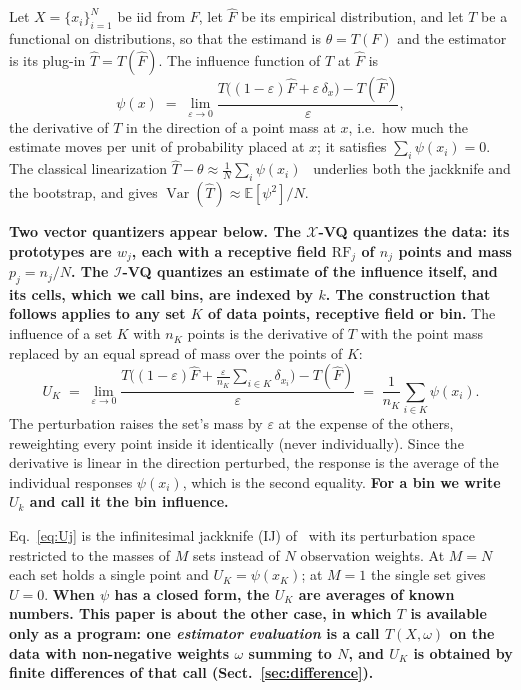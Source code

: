 \documentclass[runningheads]{llncs}
\newif\ifrev \revtrue
\newcommand{\rev}[1]{\ifrev{\color{blue}\bfseries #1}\else#1\fi}
\newcommand{\XVQ}{\ensuremath{\mathcal{X}}-VQ}
\newcommand{\IVQ}{\ensuremath{\mathcal{I}}-VQ}
\begin{document}
Let $X=\{x_i\}_{i=1}^{N}$ be iid from $F$, let $\hat{F}$ be its empirical
distribution, and let $T$ be a functional on distributions, so that the
estimand is $\theta = T(F)$ and the estimator is its plug-in
$\hat{T} = T(\hat{F})$. The influence function of $T$ at $\hat{F}$ is
%
\begin{equation}\label{eq:if}
  \psi(x) \;=\; \lim_{\varepsilon \to 0}
  \frac{T\!\big((1-\varepsilon)\hat{F} + \varepsilon\,\delta_x\big) - T(\hat{F})}
       {\varepsilon},
\end{equation}
%
the derivative of $T$ in the direction of a point mass at $x$, i.e.\ how much
the estimate moves per unit of probability placed at $x$; it satisfies
$\sum_i \psi(x_i) = 0$. The classical linearization
$\hat{T} - \theta \approx \tfrac{1}{N}\sum_i \psi(x_i)$~\cite{vonmises1947,hampel1974}
underlies both the jackknife and the bootstrap, and gives
$\operatorname{Var}(\hat{T}) \approx \mathbb{E}[\psi^2]/N$.

\rev{Two vector quantizers appear below. The \XVQ{} quantizes the data: its prototypes are $w_j$, each with a receptive field $\mathrm{RF}_j$ of $n_j$ points and mass $p_j = n_j/N$. The \IVQ{} quantizes an estimate of the influence itself, and its cells, which we call bins, are indexed by $k$. The construction that follows applies to any set $K$ of data points, receptive field or bin.} The influence of a set $K$ with $n_K$ points is the derivative of $T$ with the point mass replaced by an equal spread of mass over the points of $K$:
%
\begin{equation}\label{eq:Uj}
  U_K \;=\; \lim_{\varepsilon \to 0}
  \frac{T\!\Big((1-\varepsilon)\hat{F}
        + \frac{\varepsilon}{n_K}\sum_{i \in K} \delta_{x_i}\Big)
        - T(\hat{F})}{\varepsilon}
  \;=\; \frac{1}{n_K} \sum_{i \in K} \psi(x_i).
\end{equation}
%
The perturbation raises the set's mass by $\varepsilon$ at the expense of the
others, reweighting every point inside it identically (never individually).
Since the derivative is linear in the direction perturbed, the response is the
average of the individual responses $\psi(x_i)$, which is the second equality. \rev{For a bin we write $U_k$ and call it the bin influence.}

Eq.~\eqref{eq:Uj} is the infinitesimal jackknife (IJ) of~\cite{jaeckel1972} with its perturbation space restricted to the masses of $M$ sets instead of $N$ observation weights. At $M = N$ each set holds a single point and $U_K = \psi(x_K)$; at $M = 1$ the single set gives $U = 0$. \rev{When $\psi$ has a closed form, the $U_K$ are averages of known numbers. This paper is about the other case, in which $T$ is available only as a program: one \emph{estimator evaluation} is a call $T(X,\omega)$ on the data with non-negative weights $\omega$ summing to $N$, and $U_K$ is obtained by finite differences of that call (Sect.~\ref{sec:difference}).}
\end{document}

